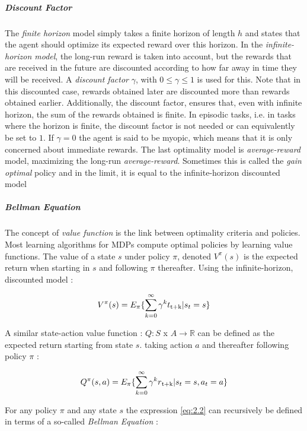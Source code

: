 \subparagraph{Discount Factor}The \textit{finite horizon} model simply takes a finite horizon of length $h$ and states that the agent should optimize its expected reward over this horizon. In the \textit{infinite-horizon model}, the long-run reward is taken into account, but the rewards that are received in the future are discounted according to how far away in time they will be received.
A \textit{discount factor} $\gamma$, with $0 \leq \gamma \leq 1$ is used for this. Note that in this discounted case, rewards obtained later are discounted more than rewards obtained earlier. Additionally, the discount factor, ensures that, even with infinite horizon, the sum of the rewards obtained is finite. In episodic tasks, i.e. in tasks where the horizon is finite, the discount factor is not
needed or can equivalently be set to $1$. If $\gamma = 0$ the agent is said to be myopic, which means that it is only concerned about immediate rewards.
The last optimality model is \textit{average-reward} model, maximizing the long-run \textit{average-reward}. Sometimes this is called the \textit{gain optimal} policy and in the limit, it is equal to the infinite-horizon discounted model~\cite{wiering2012reinforcement}

\subparagraph{Bellman Equation} The concept of \textit{value function} is the link between optimality criteria and policies. Most learning algorithms for MDPs compute optimal policies by learning value functions. The value of a state $s$ under policy $\pi$, denoted $V^\pi (s)$ is the expected return when starting in $s$ and following $\pi$ thereafter. Using the infinite-horizon, discounted model :

\begin{equation}
	V^\pi (s) = E_\pi \{\sum_{k = 0}^{\infty} \gamma^k t\textsubscript{t+k} | s_t = s\}
\end{equation}

A similar state-action value function : $Q : S$ x $A \rightarrow \mathbb{R}$ can be defined as the expected return starting from state $s$. taking action $a$ and thereafter following policy $\pi$ :

\begin{equation} \label{eq:2.2}
	Q^\pi (s,a) = E_\pi\{\sum_{k = 0}^{\infty} \gamma^k r\textsubscript{t+k} | s_t = s, a_t = a\}
\end{equation}

For any policy $\pi$ and any state $s$ the expression \ref{eq:2.2} can recursively be defined in terms of a so-called \textit{Bellman Equation} :

